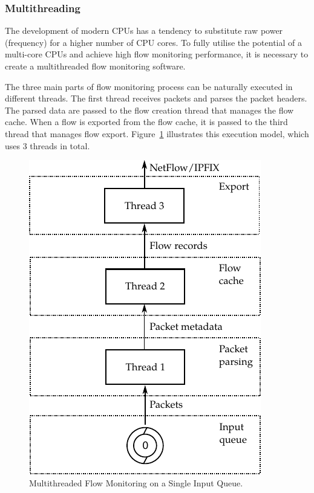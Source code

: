 \subsubsection{Multithreading}

The development of modern CPUs has a tendency to substitute raw power (frequency) for a higher number of CPU cores. To fully utilise the potential of a multi-core CPUs and achieve high flow monitoring performance, it is necessary to create a multithreaded flow monitoring software.

The three main parts of flow monitoring process can be naturally executed in different threads. The first thread receives packets and parses the packet headers. The parsed data are passed to the flow creation thread that manages the flow cache. When a flow is exported from the flow cache, it is passed to the third thread that manages flow export. Figure~\ref{fig:exporter-thread-noRSS} illustrates this execution model, which uses $3$ threads in total.

\begin{figure}[t!]
  \begin{center}
    \includegraphics{figures/c05/exporter-thread-noRSS}
  \end{center}
  \caption{Multithreaded Flow Monitoring on a Single Input Queue.}
  \label{fig:exporter-thread-noRSS}
\end{figure}


